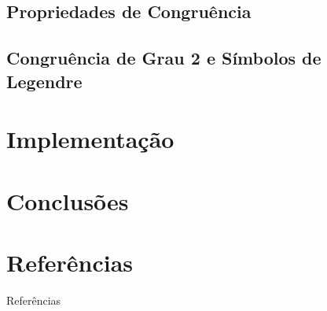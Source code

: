 \documentclass[xcolor=table]{beamer}
\begin{document}
        
        \subsection[]{Propriedades de Congruência} \label{sub:prop-cong}
        
        \subsection[]{Congruência de Grau 2 e Símbolos de Legendre} \label{sub:cong-grau2}
              

    
    
    \section[]{Implementação}

        
        

    \section[]{Conclusões}

   
    \section[]{Referências}
    \begin{frame}[allowframebreaks]{Referências}
        
    \end{frame}
\end{document}
